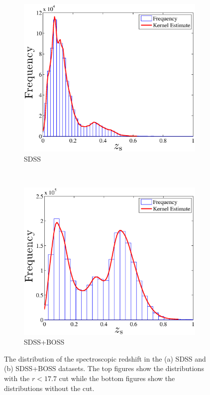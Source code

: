 \documentclass[useAMS,usenatbib,fleqn]{mn2e}
\begin{document}
\begin{figure}
        
       \begin{subfigure}[b]{0.45\textwidth}
                \includegraphics[width=\textwidth]{figures/zspec_sdss}
                \caption{SDSS}
        \end{subfigure}
        ~
        \begin{subfigure}[b]{0.45\textwidth}
                \includegraphics[width=\textwidth]{figures/zspec_boss}
                \caption{SDSS+BOSS}
        \end{subfigure}

        
        \caption{The distribution of the spectroscopic redshift in the (a) SDSS and (b) SDSS+BOSS datasets. The top figures show the distributions with the $r<17.7$ cut while the bottom figures show the distributions without the cut.}
        \label{fig-zpec-sdss}
\end{figure}
\end{document}
